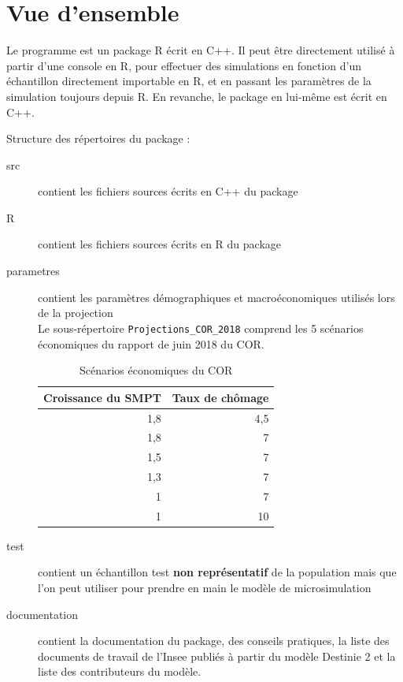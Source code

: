 \section{Vue d'ensemble}

Le programme est un package R écrit en C++. Il peut
être directement utilisé à partir d'une console en R, 
pour effectuer des simulations en fonction d'un échantillon
directement importable en R, et en passant les paramètres de la simulation
toujours depuis R. En revanche, le package en lui-même est écrit en C++. 

Structure des répertoires du package :

	\begin{description}
		\item[src] contient les fichiers sources écrits en C++ du package
		\item[R] contient les fichiers sources écrits en R du package
		\item[parametres] contient les paramètres démographiques et macroéconomiques utilisés lors de la projection\\
Le sous-répertoire {\tt Projections\_COR\_2018} comprend les 5 scénarios économiques du rapport de juin 2018 du COR. 
\renewcommand{\arraystretch}{1.8}

\begin{table}[h]
  \centering
  \caption{Scénarios économiques du COR}
    \begin{tabular}{rr}
    \toprule
 Croissance du SMPT & Taux de chômage \\
    \midrule
 1,8     & 4,5 \\
 1,8   & 7 \\
 1,5   & 7 \\
 1,3   & 7 \\
 1     & 7 \\
 1     & 10 \\
    \bottomrule
    \end{tabular}%
  \label{tab:hypscCOR}%
\end{table}%
		\item[test] contient un échantillon test \textbf{non représentatif} de la population mais que l'on peut utiliser pour prendre en main le modèle de microsimulation
		\item[documentation] contient la documentation du package, des conseils pratiques, la liste des documents de travail de l'Insee publiés à partir du modèle Destinie 2 et la liste des contributeurs du modèle.
	\end{description}






